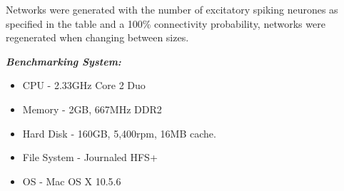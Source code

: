 \documentclass[12pt,twoside]{article}
\newcommand\liststyleLii{%
\renewcommand\labelitemi{{\textbullet}}
\renewcommand\labelitemii{${\circ}$}
\renewcommand\labelitemiii{${\blacksquare}$}
\renewcommand\labelitemiv{{\textbullet}}
}
\begin{document}
\bigskip


\bigskip


\bigskip



\bigskip

{\mdseries\upshape
Networks were generated with the number of excitatory spiking neurones
as specified in the table and a 100\% connectivity probability,
networks were regenerated when changing between sizes.}


\bigskip

{\bfseries\itshape
\textmd{\textup{Benchmarking }}\textmd{\textup{System:}}}

\liststyleLii
\begin{itemize}
\item {\mdseries\upshape
CPU  {}- 2.33GHz Core 2 Duo}
\item {\mdseries\upshape
Memory  {}- 2GB, 667MHz DDR2}
\item {\mdseries\upshape
Hard Disk {}- 160GB, 5,400rpm, 16MB cache.}
\item \textmd{\textup{File System {}-
}}\foreignlanguage{english}{\textmd{\textup{Journaled}}}\textmd{\textup{
HFS+}}
\item {\mdseries\upshape
OS  {}- Mac OS X 10.5.6}
\end{itemize}

\bigskip
\end{document}
